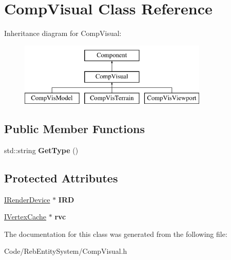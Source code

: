 \hypertarget{class_comp_visual}{}\section{Comp\+Visual Class Reference}
\label{class_comp_visual}
Inheritance diagram for Comp\+Visual\+:\begin{figure}[H]
\begin{center}
\leavevmode
\includegraphics[height=3.000000cm]{class_comp_visual}
\end{center}
\end{figure}
\subsection*{Public Member Functions}
\begin{DoxyCompactItemize}
\item 
std\+::string {\bfseries Get\+Type} ()\hypertarget{class_comp_visual_a87b320b011374cccf8e69b64f1d74fb9}{}\label{class_comp_visual_a87b320b011374cccf8e69b64f1d74fb9}

\end{DoxyCompactItemize}
\subsection*{Protected Attributes}
\begin{DoxyCompactItemize}
\item 
\hyperlink{class_i_render_device}{I\+Render\+Device} $\ast$ {\bfseries I\+RD}\hypertarget{class_comp_visual_aa0050d76d0d62fa914411576595e89d6}{}\label{class_comp_visual_aa0050d76d0d62fa914411576595e89d6}

\item 
\hyperlink{class_i_vertex_cache}{I\+Vertex\+Cache} $\ast$ {\bfseries rvc}\hypertarget{class_comp_visual_aa04522ccdab76a9e26f687290dd43d2c}{}\label{class_comp_visual_aa04522ccdab76a9e26f687290dd43d2c}

\end{DoxyCompactItemize}


The documentation for this class was generated from the following file\+:\begin{DoxyCompactItemize}
\item 
Code/\+Reb\+Entity\+System/Comp\+Visual.\+h\end{DoxyCompactItemize}
